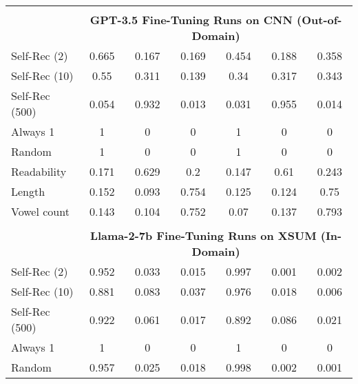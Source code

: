 \begin{table}[h]
\begin{tabular}{l|cccccc}
        \multicolumn{7}{c}{} \\
        \multicolumn{1}{c}{} & \multicolumn{6}{c}{\textbf{GPT-3.5 Fine-Tuning Runs on CNN (Out-of-Domain)}} \\
        Self-Rec (2)                       & 0.665       & 0.167     & 0.169        & 0.454       & 0.188     & 0.358       \\
        Self-Rec (10)                      & 0.55        & 0.311     & 0.139        & 0.34        & 0.317     & 0.343       \\
        Self-Rec (500)                     & 0.054       & 0.932     & 0.013        & 0.031       & 0.955     & 0.014       \\
        Always 1                           & 1           & 0         & 0            & 1           & 0         & 0           \\
        Random                             & 1           & 0         & 0            & 1           & 0         & 0           \\
        Readability                        & 0.171       & 0.629     & 0.2          & 0.147       & 0.61      & 0.243       \\
        Length                             & 0.152       & 0.093     & 0.754        & 0.125       & 0.124     & 0.75        \\
        Vowel count                        & 0.143       & 0.104     & 0.752        & 0.07        & 0.137     & 0.793       \\
        \multicolumn{7}{c}{} \\
        \multicolumn{1}{c}{} & \multicolumn{6}{c}{\textbf{Llama-2-7b Fine-Tuning Runs on XSUM (In-Domain)}} \\
        Self-Rec (2)                       & 0.952       & 0.033     & 0.015        & 0.997       & 0.001     & 0.002       \\
        Self-Rec (10)                      & 0.881       & 0.083     & 0.037        & 0.976       & 0.018     & 0.006       \\
        Self-Rec (500)                     & 0.922       & 0.061     & 0.017        & 0.892       & 0.086     & 0.021       \\
        Always 1                           & 1           & 0         & 0            & 1           & 0         & 0           \\
        Random                             & 0.957       & 0.025     & 0.018        & 0.998       & 0.002     & 0.001       \\

\end{tabular}
\end{table}
